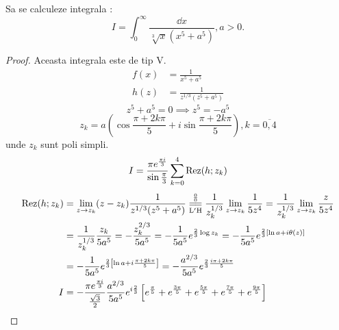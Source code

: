     \begin{aplicatie}
        Sa se calculeze integrala :
        \[
            I = \int_{0}^{\infty} \frac{\dd x}{\sqrt[3]{x}(x^5+a^5)} , a > 0.
        \]
        \begin{proof}
            Aceasta integrala este de tip $\mathrm{V}$.
            \begin{align*}
                f(x) &= \frac{1}{x^5+a^5} \\
                h(z) &= \frac{1}{z^{1/3}(z^5+a^5)}
            \end{align*}
            \[
                z^5+a^5 = 0 \implies z^5 = -a^5
            \]
            \[
                z_k = a\left( \cos \frac{\pi+2k\pi}{5} + i \sin \frac{\pi+2k\pi}{5} \right)
                , k = \overline{0,4}
            \]
            unde $z_k$ sunt poli simpli.
            \[
                I = \frac {\pi e^{\frac{\pi i}{3}}}{\sin \frac{\pi}{3}}
                    \sum_{k=0}^{4} \operatorname{Rez}(h;z_k)
            \]
            \begin{align*}
                \Rez(h;z_k) &= \lim_{z\to z_k}(z-z_k)\frac{1}{z^{1/3}(z^5+a^5)}
                    \EqConformCaz
                    \frac{1}{z_k^{1/3}} \lim_{z\to z_k} \frac{1}{5z^4}
                    = \frac{1}{z_k^{1/3}} \lim_{z\to z_k} \frac{z}{5z^4}
                    \\
                    &= \frac{1}{z_k^{1/3}} \frac{z_k}{5a^5}
                    = - \frac{z_k^{2/3}}{5a^5}
                    = - \frac{1}{5a^5} e^{\frac{2}{3}\log z_k}
                    = - \frac{1}{5a^5} e^{\frac{2}{3} [\ln a + i \theta(z)]}
                    \\
                    &= - \frac{1}{5a^5} e^{\frac{2}{3} \left[\ln a + i \frac{\pi+2k\pi}{5}\right]}
                    = - \frac{a^{2/3}}{5a^5} e^{\frac{2}{3} \frac{i \pi + 2k\pi}{5}}
                    \\
                I &= -\frac{\pi e^{\frac{\pi i}{3}}}{\frac{\sqrt{3}}{2}} \frac{a^{2/3}}{5a^5}
                    e^{i\frac{2}{3}}
                    \left[e^{\frac{\pi}{5}} + e^{\frac{3 \pi}{5}}
                    + e^{\frac{5 \pi}{5}} +e^{\frac{7 \pi}{5}} +e^{\frac{9 \pi}{5}}
                    \right]
            \end{align*}
        \end{proof}
    \end{aplicatie}